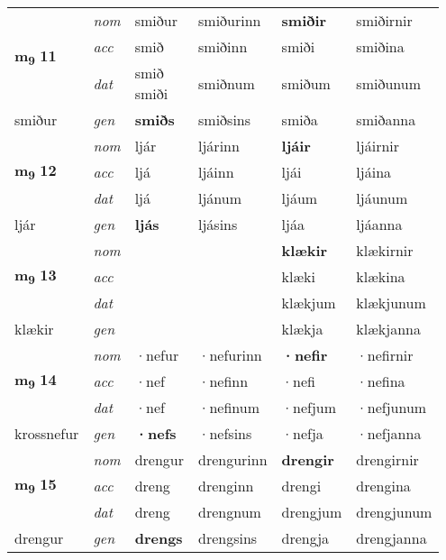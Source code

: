 \begin{longtable}[l]{X>{\footnotesize\itshape}XXXXX}
\multirow{3}{*}{{{\textbf{m{\textsubscript{9}}} \Large{\textbf{11}}}}}  
 & nom & smiður & smiðurinn    & \textbf{smiðir} & smiðirnir  \\*
 & acc & smið  & smiðinn   & smiði  & smiðina \\*
 & dat & \specialcell{smið\\ smiði} & smiðnum   & smiðum & smiðunum \\*
 {\footnotesize{smiður}} &  gen & \textbf{smiðs}  & smiðsins  & smiða & smiðanna \\
\cmidrule{1-6}


\multirow{3}{*}{{{\textbf{m{\textsubscript{9}}} \Large{\textbf{12}}}}}  
 & nom & ljár & ljárinn    & \textbf{ljáir} & ljáirnir  \\*
 & acc & ljá  & ljáinn   & ljái  & ljáina \\*
 & dat & ljá & ljánum   & ljáum & ljáunum \\*
 {\footnotesize{ljár}} &  gen & \textbf{ljás}  & ljásins  & ljáa & ljáanna \\
\cmidrule{1-6}


\multirow{3}{*}{{{\textbf{m{\textsubscript{9}}} \Large{\textbf{13}}}}}  
 & nom &  &     & \textbf{klækir} & klækirnir  \\*
 & acc &   &    & klæki  & klækina \\*
 & dat &  &    & klækjum & klækjunum \\*
 {\footnotesize{klækir}} &  gen & \textbf{}  &   & klækja & klækjanna \\
\cmidrule{1-6}


\multirow{3}{*}{{{\textbf{m{\textsubscript{9}}} \Large{\textbf{14}}}}}  
 & nom & ·nefur & ·nefurinn    & \textbf{·nefir} & ·nefirnir  \\*
 & acc & ·nef  & ·nefinn   & ·nefi  & ·nefina \\*
 & dat & ·nef & ·nefinum   & ·nefjum & ·nefjunum \\*
 {\footnotesize{krossnefur}} &  gen & \textbf{·nefs}  & ·nefsins  & ·nefja & ·nefjanna \\
\cmidrule{1-6}


\multirow{3}{*}{{{\textbf{m{\textsubscript{9}}} \Large{\textbf{15}}}}}  
 & nom & drengur & drengurinn    & \textbf{drengir} & drengirnir  \\*
 & acc & dreng  & drenginn   & drengi  & drengina \\*
 & dat & dreng & drengnum   & drengjum & drengjunum \\*
 {\footnotesize{drengur}} &  gen & \textbf{drengs}  & drengsins  & drengja & drengjanna \\
\cmidrule{1-6}



\end{longtable}
